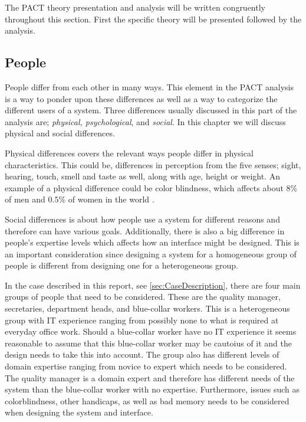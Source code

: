 The PACT theory presentation and analysis will be written congruently throughout this section.
First the specific theory will be presented followed by the analysis.

\subsection{People}\label{sec:PACT-people}
People differ from each other in many ways.
This element in the PACT analysis is a way to ponder upon these differences as well as a way to categorize the different users of a system.
Three differences usually discussed in this part of the analysis are; \textit{physical, psychological}, and \textit{social}.
In this chapter we will discuss physical and social differences.

Physical differences covers the relevant ways people differ in physical characteristics.
This could be, differences in perception from the five senses; sight, hearing, touch, smell and taste as well, along with age, height or weight.
An example of a physical difference could be color blindness, which affects about $8\%$ of men and $0.5\%$ of women in the world \cite{ColourBlind}.

Social differences is about how people use a system for different reasons and therefore can have various goals.
Additionally, there is also a big difference in people's expertise levels which affects how an interface might be designed.
This is an important consideration since designing a system for a homogeneous group of people is  different from designing one for a heterogeneous group.

In the case described in this report, see \cref{sec:CaseDescription}, there are four main groups of people that need to be considered.
These are the quality manager, secretaries, department heads, and blue-collar workers.
This is a heterogeneous group with IT experience ranging from possibly none to what is required at everyday office work.
Should a blue-collar worker have no IT experience it seems reasonable to assume that this blue-collar worker may be cautoius of it and the design needs to take this into account.
The group also has different levels of domain expertise ranging from novice to expert which needs to be considered.
The quality manager is a domain expert and therefore has different needs of the system than the blue-collar worker with no expertise.
Furthermore, issues such as colorblindness, other handicaps, as well as bad memory needs to be considered when designing the system and interface.

